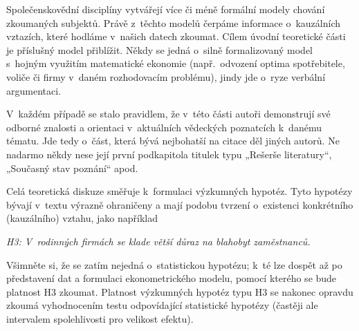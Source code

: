 \documentclass[11pt,a4paper]{article}
\begin{document}
Společenskovědní disciplíny vytvářejí více či méně formální modely chování zkoumaných subjektů. Právě z~těchto modelů čerpáme informace o~kauzálních vztazích, které hodláme v~našich datech zkoumat. Cílem úvodní teoretické části je příslušný model přiblížit. Někdy se jedná o~silně formalizovaný model s~hojným využitím matematické ekonomie (např.\ odvození optima spotřebitele, voliče či firmy v~daném rozhodovacím problému), jindy jde o~ryze verbální argumentaci.

V~každém případě se stalo pravidlem, že v~této části autoři demonstrují své odborné znalosti a orientaci v~aktuálních vědeckých poznatcích k~danému tématu. Jde tedy o~část, která bývá nejbohatší na citace děl jiných autorů. Ne nadarmo někdy nese její první podkapitola titulek typu „Rešerše literatury“, „Současný stav poznání“ apod.

Celá teoretická diskuze směřuje k~formulaci výzkumných hypotéz. Tyto hypotézy bývají v~textu výrazně ohraničeny a mají podobu tvrzení o~existenci konkrétního (kauzálního) vztahu, jako například
\begin{center}\itshape
H3: V~rodinných firmách se klade větší důraz na blahobyt zaměstnanců.
\end{center}
Všimněte si, že se zatím nejedná o~statistickou hypotézu; k~té lze dospět až po představení dat a formulaci ekonometrického modelu, pomocí kterého se bude platnost H3 zkoumat. Platnost výzkumných hypotéz typu H3 se nakonec opravdu zkoumá vyhodnocením testu odpovídající statistické hypotézy (častěji ale intervalem spolehlivosti pro velikost efektu).
\end{document}
